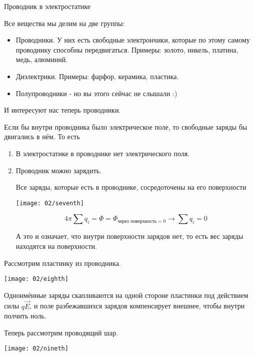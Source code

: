 \begin{section}{Проводник в электростатике}

	Все вещества мы делим на две группы:
	\begin{itemize}
	
	\item
		Проводники. У них есть свободные электрончики, которые по этому самому проводнику способны передвигаться. 
		Примеры: золото, никель, платина, медь, алюминий.
	
	\item
		Диэлектрики. Примеры: фарфор, керамика, пластика.
		
	\item
		Полупроводники - но вы этого сейчас не слышали :)
	
	\end{itemize}
	
	И интересуют нас теперь проводники.
	
	Если бы внутри проводника было электрическое поле, то свободные заряды бы двигались в нём. То есть
	\begin{enumerate}
	
	\item
		В электростатике в проводнике нет электрического поля.
		
	\item
		Проводник можно зарядить. 
		
		Все заряды, которые есть в проводнике, сосредоточены на его поверхности
		\begin{center}
		\texttt{[image: 02/seventh]}
		\end{center}

		\[4\pi\sum q_i = \Phi = \Phi_{\text{через поверхность} = 0} \rightarrow \sum q_i = 0\]
		
		А это и означает, что внутри поверхности зарядов нет, то есть вес заряды находятся на поверхности.
	
	\end{enumerate}

	Рассмотрим пластинку из проводника.
	\begin{center}
	\texttt{[image: 02/eighth]}
	\end{center}

	Одноимённые заряды скапливаются на одной стороне пластинки под действием силы $q \vec{E}$, и поле разбежавшихся зарядов компенсирует
	внешнее, чтобы внутри полчить ноль.
	
	Теперь рассмотрим проводящий шар.
	\begin{center}
	\texttt{[image: 02/nineth]}
	\end{center}


\end{section}
